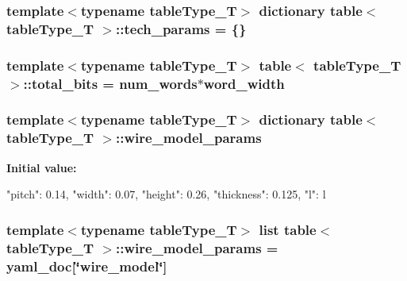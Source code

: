 \label{classtable_a9535b93bb57e405b922fb45afdb75ad0}
\hypertarget{classtable_af4623354d0c8319c4cb046c7b3e17ddb}{
\subsubsection[{tech\_\-params}]{\setlength{\rightskip}{0pt plus 5cm}template$<$typename tableType\_\-T$>$ dictionary {\bf table}$<$ tableType\_\-T $>$::{\bf tech\_\-params} = \{\}}}
\label{classtable_af4623354d0c8319c4cb046c7b3e17ddb}
\hypertarget{classtable_a965f2c5991540ea4e34dc5e9ece75b3f}{
\subsubsection[{total\_\-bits}]{\setlength{\rightskip}{0pt plus 5cm}template$<$typename tableType\_\-T$>$ {\bf table}$<$ tableType\_\-T $>$::{\bf total\_\-bits} = {\bf num\_\-words}$\ast${\bf word\_\-width}}}
\label{classtable_a965f2c5991540ea4e34dc5e9ece75b3f}
\hypertarget{classtable_aebf2e2c6c4d0ec6026901ca8e6679a5d}{
\subsubsection[{wire\_\-model\_\-params}]{\setlength{\rightskip}{0pt plus 5cm}template$<$typename tableType\_\-T$>$ dictionary {\bf table}$<$ tableType\_\-T $>$::{\bf wire\_\-model\_\-params}}}
\label{classtable_aebf2e2c6c4d0ec6026901ca8e6679a5d}
{\bfseries Initial value:}
\begin{DoxyCode}
{"pitch": 0.14,
                         "width": 0.07,
                         "height": 0.26,
                         "thickness": 0.125,
                         "l": l}
\end{DoxyCode}
\hypertarget{classtable_a26f8b3354769a96a7c51206b89d2a95e}{
\subsubsection[{wire\_\-model\_\-params}]{\setlength{\rightskip}{0pt plus 5cm}template$<$typename tableType\_\-T$>$ list {\bf table}$<$ tableType\_\-T $>$::{\bf wire\_\-model\_\-params} = {\bf yaml\_\-doc}\mbox{[}\char`\"{}wire\_\-model\char`\"{}\mbox{]}}}
